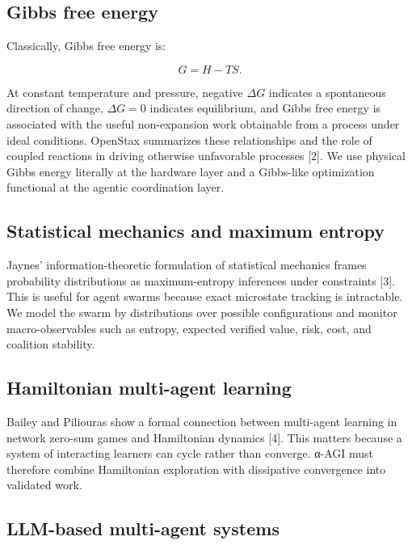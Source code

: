 \documentclass[11pt]{article}
\begin{document}
\subsection{Gibbs free energy}\label{gibbs-free-energy}

Classically, Gibbs free energy is:

\[
G=H-TS.
\]

At constant temperature and pressure, negative \(\Delta G\) indicates a
spontaneous direction of change, \(\Delta G=0\) indicates equilibrium,
and Gibbs free energy is associated with the useful non-expansion work
obtainable from a process under ideal conditions. OpenStax summarizes
these relationships and the role of coupled reactions in driving
otherwise unfavorable processes {[}2{]}. We use physical Gibbs energy
literally at the hardware layer and a Gibbs-like optimization functional
at the agentic coordination layer.

\subsection{Statistical mechanics and maximum
entropy}\label{statistical-mechanics-and-maximum-entropy}

Jaynes' information-theoretic formulation of statistical mechanics
frames probability distributions as maximum-entropy inferences under
constraints {[}3{]}. This is useful for agent swarms because exact
microstate tracking is intractable. We model the swarm by distributions
over possible configurations and monitor macro-observables such as
entropy, expected verified value, risk, cost, and coalition stability.

\subsection{Hamiltonian multi-agent
learning}\label{hamiltonian-multi-agent-learning}

Bailey and Piliouras show a formal connection between multi-agent
learning in network zero-sum games and Hamiltonian dynamics {[}4{]}.
This matters because a system of interacting learners can cycle rather
than converge. α-AGI must therefore combine Hamiltonian exploration with
dissipative convergence into validated work.

\subsection{LLM-based multi-agent
systems}\label{llm-based-multi-agent-systems}
\end{document}
